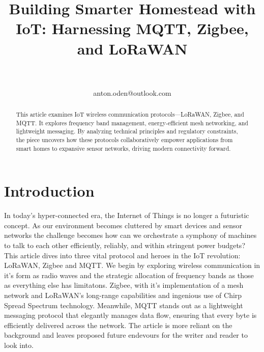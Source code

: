 \documentclass[article,a4paper]{IEEEtran}
\title{Building Smarter Homestead with IoT: Harnessing MQTT, Zigbee, and LoRaWAN}
\author{
\IEEEauthorblockN{Anton Odén}\\
\IEEEauthorblockA{Dept. of Maths and Computer Science\\Karlstad University\\
651 88 KARLSTAD, Sweden}\\
anton.oden@outlook.com
}
\begin{document}
\maketitle

    \begin{abstract}
        This article examines IoT wireless communication protocols—LoRaWAN, Zigbee, and MQTT. It explores frequency band management, energy-efficient mesh networking, and lightweight messaging. By analyzing technical principles and regulatory constraints, the piece uncovers how these protocols collaboratively empower applications from smart homes to expansive sensor networks, driving modern connectivity forward.    
    \end{abstract}

    \section{Introduction}
    In today's hyper-connected era, the Internet of Things is no longer a futuristic concept. As our environment becomes cluttered by smart devices and sensor networks the challenge becomes how can we orchestrate a symphony of machines to talk to each other efficiently, reliably, and within stringent power budgets? This article dives into three vital protocol and heroes in the IoT revolution: LoRaWAN, Zigbee and MQTT. 
    \newline\newline
    We begin by exploring wireless communication in it's form as radio waves and the strategic allocation of frequency bands as those as everything else has limitatons. Zigbee, with it's implementation of a mesh network and LoRaWAN's long-range capabilities and ingenious use of Chirp Spread Spectrum technology. Meanwhile, MQTT stands out as a lightweight messaging protocol that elegantly manages data flow, ensuring that every byte is efficiently delivered across the network. The article is more reliant on the background and leaves proposed future endevours for the writer and reader to look into. 
\end{document}
